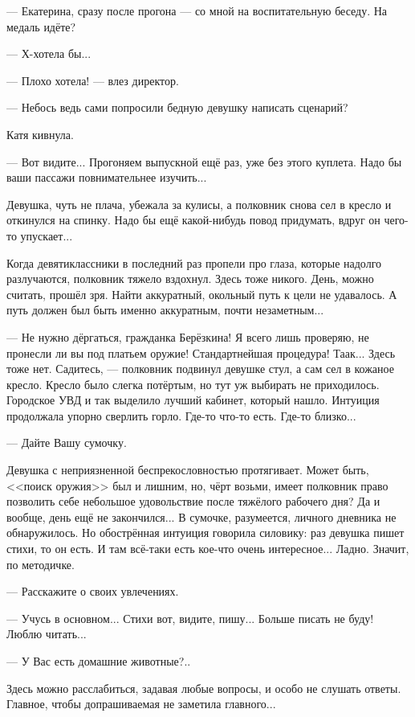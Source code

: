 --- Екатерина, сразу после прогона --- со мной на воспитательную беседу. На медаль идёте?

--- Х-хотела бы...

--- Плохо хотела! --- влез директор.

--- Небось ведь сами попросили бедную девушку написать сценарий?

Катя кивнула.

--- Вот видите... Прогоняем выпускной ещё раз, уже без этого куплета. Надо бы ваши пассажи повнимательнее изучить...

Девушка, чуть не плача, убежала за кулисы, а полковник снова сел в кресло и откинулся на спинку.
Надо бы ещё какой-нибудь повод придумать, вдруг он чего-то упускает...


Когда девятиклассники в последний раз пропели про глаза, которые надолго разлучаются, полковник тяжело вздохнул.
Здесь тоже никого. День, можно считать, прошёл зря.
Найти аккуратный, окольный путь к цели не удавалось. А путь должен был быть именно аккуратным, почти незаметным...

\emptypar

--- Не нужно дёргаться, гражданка Берёзкина! Я всего лишь проверяю, не пронесли ли вы под платьем оружие!
Стандартнейшая процедура! Таак... Здесь тоже нет. Садитесь, ---
полковник подвинул девушке стул, а сам сел в кожаное кресло. Кресло было слегка потёртым, но тут уж выбирать не приходилось.
Городское УВД и так выделило лучший кабинет, который нашло.
Интуиция продолжала упорно сверлить горло. Где-то что-то есть. Где-то близко...

--- Дайте Вашу сумочку.

Девушка с неприязненной беспрекословностью протягивает.
Может быть, <<поиск оружия>> был и лишним, но, чёрт возьми,
имеет полковник право позволить себе небольшое удовольствие после тяжёлого рабочего дня?
Да и вообще, день ещё не закончился...
В сумочке, разумеется, личного дневника не обнаружилось. Но обострённая интуиция говорила силовику:
раз девушка пишет стихи, то он есть. И там всё-таки есть кое-что очень интересное... Ладно. Значит, по методичке.

--- Расскажите о своих увлечениях.

--- Учусь в основном... Стихи вот, видите, пишу... Больше писать не буду! Люблю читать...

--- У Вас есть домашние животные?..

Здесь можно расслабиться, задавая любые вопросы, и особо не слушать ответы. Главное, чтобы допрашиваемая не заметила главного...

